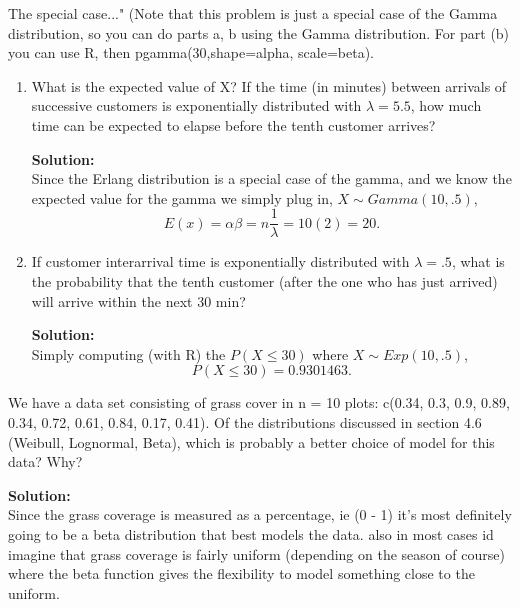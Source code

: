 \documentclass[12pt]{article}
\makeatletter
\theoremstyle{homework}
\newenvironment{exercise}[1]
{\def\@currentlabel{#1}\exercisecore}
{\endexercisecore}
\newcommand{\localhead}[1]{\par\smallskip\noindent\textbf{#1}\nobreak\\}%
\newcommand\solution{\localhead{Solution:}}
\makeatother
\begin{document}
\begin{exercise}{4.68} "The special case..."  (Note that this problem is just a special case of the Gamma distribution, so you can do parts a, b using the Gamma distribution. For part (b) you can use R, then pgamma(30,shape=alpha, scale=beta).\\

  \begin{enumerate}
    \item  What is the expected value of X? If the time (in minutes)  between  arrivals  of  successive  customers  is  exponentially  distributed  with  $\lambda = 5.5$,  how  much  time can be expected to elapse before the tenth customer arrives?\\
    
    \solution Since the Erlang distribution is a special case of the gamma, and we know the expected value for the gamma we simply plug in,
    $X \sim Gamma(10, .5)$,
    \begin{equation*}
      E(x) = \alpha\beta = n \dfrac{1}{\lambda} = 10(2) = 20.
    \end{equation*}
    \vspace{.25in}
  


    \item If customer interarrival time is exponentially distributed  with  $\lambda = .5$,  what  is  the  probability  that  the  tenth  customer  (after  the  one  who  has  just  arrived)  will arrive within the next 30 min?\\
    
    \solution Simply computing (with R) the $P(X\le 30)$ where $X \sim Exp(10, .5)$,
    \begin{equation*}
      P(X\le 30) = 0.9301463.
    \end{equation*}
    
  \end{enumerate}

\end{exercise}
\vspace{.5in}




\begin{exercise}{Supplimental 1} We have a data set consisting of grass cover in n = 10 plots:  c(0.34, 0.3, 0.9, 0.89, 0.34, 0.72, 0.61, 0.84, 0.17, 0.41).  Of the distributions discussed in section 4.6 (Weibull, Lognormal, Beta), which is probably a better choice of model for this data?  Why?\\

  
\solution Since the grass coverage is measured as a percentage, ie (0 - 1) it's most definitely going to be a beta distribution that best models the data. also in most cases id imagine 
that grass coverage is fairly uniform (depending on the season of course) where the beta function gives the flexibility to model something close to the uniform. 

\end{exercise}
\vspace{.5in}
\end{document}
